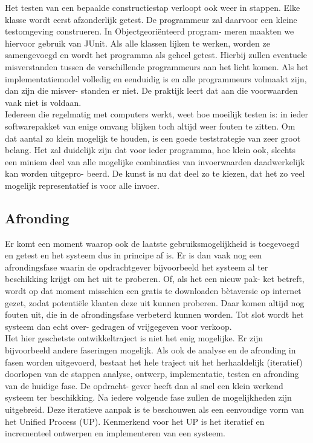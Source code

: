 \documentclass{article}
\begin{document}
	Het testen van een bepaalde constructiestap verloopt ook weer in stappen.
	Elke klasse wordt eerst afzonderlijk getest. De programmeur zal daarvoor
	een kleine testomgeving construeren. In Objectgeoriënteerd program-
	meren maakten we hiervoor gebruik van JUnit. Als alle klassen lijken te
	werken, worden ze samengevoegd en wordt het programma als geheel
	getest. Hierbij zullen eventuele misverstanden tussen de verschillende
	programmeurs aan het licht komen. Als het implementatiemodel volledig
	en eenduidig is en alle programmeurs volmaakt zijn, dan zijn die misver-
	standen er niet. De praktijk leert dat aan die voorwaarden vaak niet is
	voldaan. \\
	Iedereen die regelmatig met computers werkt, weet hoe moeilijk testen
	is: in ieder softwarepakket van enige omvang blijken toch altijd weer
	fouten te zitten. Om dat aantal zo klein mogelijk te houden, is een goede
	teststrategie van zeer groot belang. Het zal duidelijk zijn dat voor ieder
	programma, hoe klein ook, slechts een miniem deel van alle mogelijke
	combinaties van invoerwaarden daadwerkelijk kan worden uitgepro-
	beerd. De kunst is nu dat deel zo te kiezen, dat het zo veel mogelijk
	representatief is voor alle invoer.
	
	\subsection{Afronding}
	
	Er komt een moment waarop ook de laatste gebruiksmogelijkheid is
	toegevoegd en getest en het systeem dus in principe af is. Er is dan vaak
	nog een afrondingsfase waarin de opdrachtgever bijvoorbeeld het systeem
	al ter beschikking krijgt om het uit te proberen. Of, als het een nieuw pak-
	ket betreft, wordt op dat moment misschien een gratis te downloaden
	bètaversie op internet gezet, zodat potentiële klanten deze uit kunnen
	proberen. Daar komen altijd nog fouten uit, die in de afrondingsfase
	verbeterd kunnen worden. Tot slot wordt het systeem dan echt over-
	gedragen of vrijgegeven voor verkoop. \\
	Het hier geschetste ontwikkeltraject is niet het enig mogelijke. Er zijn
	bijvoorbeeld andere faseringen mogelijk. Als ook de analyse en de
	afronding in fasen worden uitgevoerd, bestaat het hele traject uit het
	herhaaldelijk (iteratief) doorlopen van de stappen analyse, ontwerp,
	implementatie, testen en afronding van de huidige fase. De opdracht-
	gever heeft dan al snel een klein werkend systeem ter beschikking.
	Na iedere volgende fase zullen de mogelijkheden zijn uitgebreid.
	Deze iteratieve aanpak is te beschouwen als een eenvoudige vorm van
	het Unified Process (UP). Kenmerkend voor het UP is het iteratief en
	incrementeel ontwerpen en implementeren van een systeem.
	
\end{document}
